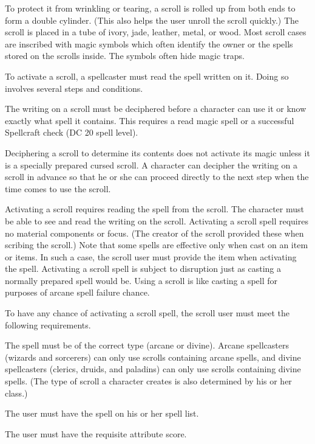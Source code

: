 To protect it from wrinkling or tearing, a scroll is rolled up from both ends to form a double cylinder. (This also helps the user unroll the scroll quickly.) The scroll is placed in a tube of ivory, jade, leather, metal, or wood. Most scroll cases are inscribed with magic symbols which often identify the owner or the spells stored on the scrolls inside. The symbols often hide magic traps.

 To activate a scroll, a spellcaster must read the spell written on it. Doing so involves several steps and conditions.

 The writing on a scroll must be deciphered before a character can use it or know exactly what spell it contains. This requires a read magic spell or a successful Spellcraft check (DC 20 \add spell level).

Deciphering a scroll to determine its contents does not activate its magic unless it is a specially prepared cursed scroll. A character can decipher the writing on a scroll in advance so that he or she can proceed directly to the next step when the time comes to use the scroll.

 Activating a scroll requires reading the spell from the scroll. The character must be able to see and read the writing on the scroll. Activating a scroll spell requires no material components or focus. (The creator of the scroll provided these when scribing the scroll.) Note that some spells are effective only when cast on an item or items. In such a case, the scroll user must provide the item when activating the spell. Activating a scroll spell is subject to disruption just as casting a normally prepared spell would be. Using a scroll is like casting a spell for purposes of arcane spell failure chance.

To have any chance of activating a scroll spell, the scroll user must meet the following requirements.
\begin{itemize*}
\item The spell must be of the correct type (arcane or divine). Arcane spellcasters (wizards and sorcerers) can only use scrolls containing arcane spells, and divine spellcasters (clerics, druids, and paladins) can only use scrolls containing divine spells. (The type of scroll a character creates is also determined by his or her class.)
\item The user must have the spell on his or her spell list.
\item The user must have the requisite attribute score.
\end{itemize*}

